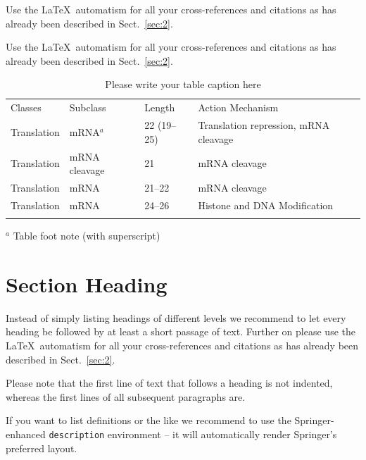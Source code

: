 \documentclass[graybox]{svmult}
\begin{document}
 Use the \LaTeX\ automatism for all your cross-references and citations as has already been described in Sect.~\ref{sec:2}.

 Use the \LaTeX\ automatism for all your cross-refer\-ences and citations as has already been described in Sect.~\ref{sec:2}.
%
%
\begin{table}
\caption{Please write your table caption here}
\label{tab:1}       %
%
%
\begin{tabular}{p{2cm}p{2.4cm}p{2cm}p{4.9cm}}
\hline\noalign{\smallskip}
Classes & Subclass & Length & Action Mechanism  \\
\noalign{\smallskip}\svhline\noalign{\smallskip}
Translation & mRNA$^a$  & 22 (19--25) & Translation repression, mRNA cleavage\\
Translation & mRNA cleavage & 21 & mRNA cleavage\\
Translation & mRNA  & 21--22 & mRNA cleavage\\
Translation & mRNA  & 24--26 & Histone and DNA Modification\\
\noalign{\smallskip}\hline\noalign{\smallskip}
\end{tabular}
$^a$ Table foot note (with superscript)
\end{table}
%
\section{Section Heading}
\label{sec:3}
Instead of simply listing headings of different levels we recommend to
let every heading be followed by at least a short passage of text.
Further on please use the \LaTeX\ automatism for all your
cross-references and citations as has already been described in
Sect.~\ref{sec:2}.

Please note that the first line of text that follows a heading is not indented, whereas the first lines of all subsequent paragraphs are.

If you want to list definitions or the like we recommend to use the Springer-enhanced \verb|description| environment -- it will automatically render Springer's preferred layout.
\end{document}
